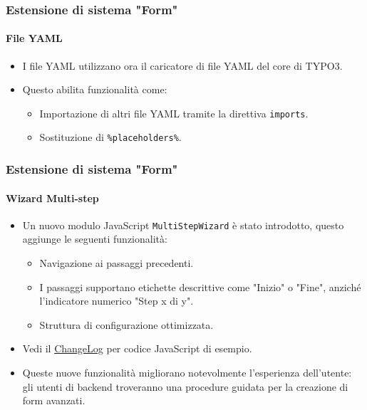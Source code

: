 
\begin{frame}[fragile]
	\frametitle{Estensione di sistema "Form"}
	\framesubtitle{File YAML}

	\begin{itemize}
		\item I file YAML utilizzano ora il caricatore di file YAML del core di TYPO3.
		\item Questo abilita funzionalità come:

			\begin{itemize}
				\item Importazione di altri file YAML tramite la direttiva \texttt{imports}.
				\item Sostituzione di \texttt{\%placeholders\%}.
			\end{itemize}

	\end{itemize}

\end{frame}


\begin{frame}[fragile]
	\frametitle{Estensione di sistema "Form"}
	\framesubtitle{Wizard Multi-step}

	\begin{itemize}
		\item Un nuovo modulo JavaScript \texttt{MultiStepWizard} è stato introdotto,
			questo aggiunge le seguenti funzionalità:

			\begin{itemize}
				\item Navigazione ai passaggi precedenti.
				\item I passaggi supportano etichette descrittive come "Inizio" o "Fine", anziché l'indicatore numerico "Step x di y".
				\item Struttura di configurazione ottimizzata.
			\end{itemize}

		\item Vedi il \href{https://docs.typo3.org/c/typo3/cms-core/master/en-us/Changelog/10.2/Feature-79445-AddMultistepWizard.html}{ChangeLog}
			per codice JavaScript di esempio.

		\item Queste nuove funzionalità migliorano notevolmente l'esperienza dell'utente: gli utenti di backend troveranno una procedure guidata per la creazione di form avanzati.

	\end{itemize}

\end{frame}

